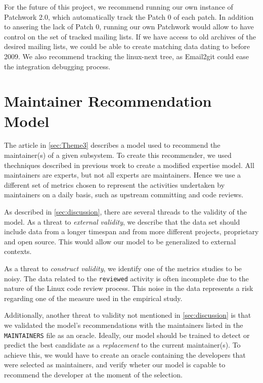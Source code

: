 For the future of this project, we recommend running our own instance of Patchwork 2.0, which automatically track the Patch 0 of each patch. In addition to ansering the lack of Patch 0, running our own Patchwork would allow to have control on the set of tracked mailing lists. If we have access to old archives of the desired mailing lists, we could be able to create matching data dating to before 2009. We also recommend tracking the linux-next tree, as Email2git could ease the integration debugging process. 


\section{Maintainer Recommendation Model}

The article in \autoref{sec:Theme3} describes a model used to recommend the maintainer(s) of a given subsystem. To create this recommender, we used thechniques described in previous work to create a modified expertise model. 
All maintainers are experts, but not all experts are maintainers. Hence we use a different set of metrics chosen to represent the activities undertaken by maintainers on a daily basis, such as upstream committing and code reviews. 

As described in \autoref{sec:discussion}, there are several threads to the validity of the model.
As a threat to \textit{external validity}, we describe that the data set should include data from a longer timespan and from more different projects, proprietary and open source. This would allow our model to be generalized to external contexts. 

As a threat to \textit{construct validity}, we identify one of the metrics studies to be noisy. The data related to the \texttt{reviewed} activity is often incomplete due to the nature of the Linux code review process. This noise in the data represents a risk regarding one of the measure used in the empirical study.

Additionally, another threat to validity not mentioned in \autoref{sec:discussion} is that we validated the model's recommendations with the maintainers listed in the \texttt{MAINTAINERS} file as an oracle. Ideally, our model should be trained to detect or predict the best candidate as a \textit{replacement} to the current maintainer(s). To achieve this, we would have to create an oracle containing the developers that were selected as maintainers, and verify wheter our model is capable to recommend the developer at the moment of the selection.


